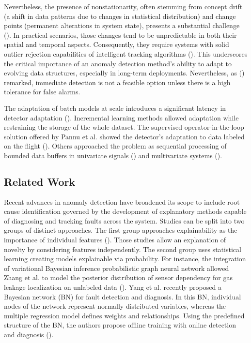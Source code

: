 Nevertheless, the presence of nonstationarity, often stemming from concept drift (a shift in data patterns due to changes in statistical distribution) and change points (permanent alterations in system state), presents a substantial challenge (\cite{Salehi2018}). In practical scenarios, those changes tend to be unpredictable in both their spatial and temporal aspects. Consequently, they require systems with solid outlier rejection capabilities of intelligent tracking algorithms (\cite{Barbosa2019162}). This underscores the critical importance of an anomaly detection method's ability to adapt to evolving data structures, especially in long-term deployments. Nevertheless, as (\cite{Tartakovsky2013}) remarked, immediate detection is not a feasible option unless there is a high tolerance for false alarms.

The adaptation of batch models at scale introduces a significant latency in detector adaptation (\cite{Wu2021}). Incremental learning methods allowed adaptation while restraining the storage of the whole dataset. The supervised operator-in-the-loop solution offered by Pannu et al. showed the detector's adaptation to data labeled on the flight (\cite{Pannu2012}).
Others approached the problem as sequential processing of bounded data buffers in univariate signals (\cite{Ahmad2017134}) and multivariate systems (\cite{Bosman201514}).

\subsection{Related Work}
Recent advances in anomaly detection have broadened its scope to include root cause identification governed by the development of explanatory methods capable of diagnosing and tracking faults across the system. Studies can be split into two groups of distinct approaches. The first group approaches explainability as the importance of individual features (\cite{Carletti2019, Nguyen2019, Amarasinghe2018}). Those studies allow an explanation of novelty by considering features independently. The second group uses statistical learning creating models explainable via probability. For instance, the integration of variational Bayesian inference probabilistic graph neural network allowed Zhang et al. to model the posterior distribution of sensor dependency for gas leakage localization on unlabeled data (\cite{ZHANG2023120542}). Yang et al. recently proposed a Bayesian network (BN) for fault detection and diagnosis. In this BN, individual nodes of the network represent normally distributed variables, whereas the multiple regression model defines weights and relationships. Using the predefined structure of the BN, the authors propose offline training with online detection and diagnosis (\cite{Yang2022}).

